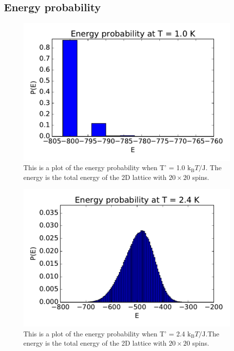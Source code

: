
\subsection{Energy probability}\label{sec:probability}

\begin{figure}[H]
\includegraphics[width=\linewidth]{../results/4d/d_T_1probability}\caption{This is a plot of the energy probability when T' = 1.0 $\text{k}_\text{B}T/\text{J}$. The energy is the total energy of the 2D lattice with $20\times 20$ spins.}\label{fig:probability_T_1.0}
\end{figure}

\begin{figure}[H]
\includegraphics[width=\linewidth]{../results/4d/d_T_2_4probability}\caption{This is a plot of the energy probability when T' = 2.4 $\text{k}_\text{B}T/\text{J}$.The energy is the total energy of the 2D lattice with $20\times 20$ spins.}\label{fig:probability_T_2.4}
\end{figure}

